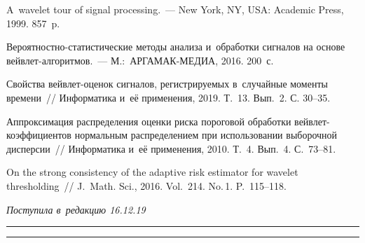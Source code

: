 \begin{multicols}{2}
{{\begin{thebibliography}{99}
 A~wavelet tour of signal processing.~--- New York, NY, USA: Academic Press, 1999. 857~p.

 Ве\-ро\-ят\-ност\-но-ста\-ти\-сти\-че\-ские 
методы анализа и~обработки сигналов на основе вейв\-лет-ал\-го\-рит\-мов.~--- М.:~АРГАМАК-МЕДИА, 2016. 200~с.

 Свойства вейв\-лет-оце\-нок сигналов, регистрируемых в~случайные моменты времени~// 
Информатика и~её применения, 2019. Т.~13. Вып.~2. С. 30--35.

 Аппроксимация распределения оценки риска пороговой обработки 
вейв\-лет-ко\-эф\-фи\-ци\-ен\-тов нормальным распределением при использовании выборочной дисперсии~// Информатика 
и~её применения, 2010. Т.~4. Вып.~4. С.~73--81.

 On the strong consistency of the adaptive risk estimator for wavelet thresholding~// 
J.~Math. Sci., 2016. Vol.~214. No.\,1. P.~115--118.
 \end{thebibliography}

 }
 }

\end{multicols}

\vspace*{-3pt}

\hfill{\small\textit{Поступила в~редакцию 16.12.19}}

\vspace*{8pt}




\hrule

\vspace*{2pt}

\hrule


\def\tit{ASYMPTOTIC REGULARITY OF~THE~WAVELET METHODS OF~INVERTING LINEAR HOMOGENEOUS
 OPERATORS FROM~OBSERVATIONS RECORDED AT~RANDOM TIMES}


\def\titkol{Asymptotic regularity of~the~wavelet methods of~inverting linear homogeneous
 operators from~observations %
 at~random times}

\def\aut{O.\,V.~Shestakov$^{1,2}$}

\def\autkol{O.\,V.~Shestakov}

